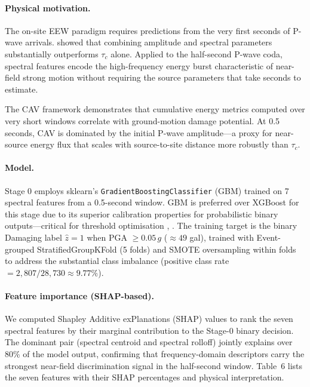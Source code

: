 \documentclass[10pt]{article}
\renewcommand{\cite}[1]{\citep{#1}}
\begin{document}
\paragraph{Physical motivation.} The on-site EEW paradigm \cite{ref17} requires predictions from the very first seconds of P-wave arrivals. \citet{ref29} showed that combining amplitude and spectral parameters substantially outperforms \(\tau_c\) alone. Applied to the half-second P-wave coda, spectral features encode the high-frequency energy burst characteristic of near-field strong motion without requiring the source parameters that take seconds to estimate.

The \citet{ref55} CAV framework demonstrates that cumulative energy metrics computed over very short windows correlate with ground-motion damage potential. At 0.5 seconds, CAV is dominated by the initial P-wave amplitude---a proxy for near-source energy flux that scales with source-to-site distance more robustly than \(\tau_c\).

\paragraph{Model.} Stage 0 employs sklearn's \texttt{GradientBoostingClassifier} (GBM) trained on 7 spectral features from a 0.5-second window. GBM is preferred over XGBoost for this stage due to its superior calibration properties for probabilistic binary outputs---critical for threshold optimisation \cite{ref36}, \cite{ref39}. The training target is the binary Damaging label \(\hat z=1\) when PGA \(\geq 0.05\,g\) (\(\approx 49\) gal), trained with Event-grouped StratifiedGroupKFold (5 folds) and SMOTE oversampling within folds to address the substantial class imbalance (positive class rate \(=2{,}807/28{,}730 \approx 9.77\%\)).

\paragraph{Feature importance (SHAP-based).}

We computed Shapley Additive exPlanations (SHAP) values to rank the seven spectral features by their marginal contribution to the Stage-0 binary decision. The dominant pair (spectral centroid and spectral rolloff) jointly explains over 80\% of the model output, confirming that frequency-domain descriptors carry the strongest near-field discrimination signal in the half-second window. Table~6 lists the seven features with their SHAP percentages and physical interpretation.
\end{document}
